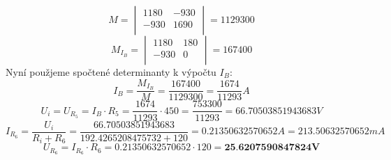 \documentclass{article}
\begin{document}
\[
  M =
  \begin{vmatrix}
    1180 & -930\\
    -930 & 1690\\
  \end{vmatrix}
  = 1129300
\]
\[
  M_{I_{B}} =
  \begin{vmatrix}
    1180 & 180\\
    -930 & 0\\
  \end{vmatrix}
  = 167400
\]
Nyní použjeme spočtené determinanty k výpočtu $I_B$:
\[
  I_{B} = \displaystyle\frac{M_{I_{B}}}{M}
  = \displaystyle\frac{167400}{1129300}
  = \displaystyle\frac{1674}{11293}A
\]
\[
  U_{i} = U_{R_{5}} = I_{B} \cdot R_{5} = \displaystyle\frac{1674}{11293}\cdot 450
  = \displaystyle\frac{753300}{11293} = 66.70503851943683 V
\]
\[
  I_{R_{6}} = \displaystyle\frac{U_{i}}{R_{i}+R_{6}}
  = \displaystyle\frac{66.70503851943683}{192.4265208475732 + 120}
  = 0.21350632570652A
  = 213.50632570652mA
\]
\[
  U_{R_{6}} = I_{R_{6}} \cdot R_{6} = 0.21350632570652 \cdot 120 = \textbf{25.6207590847824V}
\]
\end{document}
